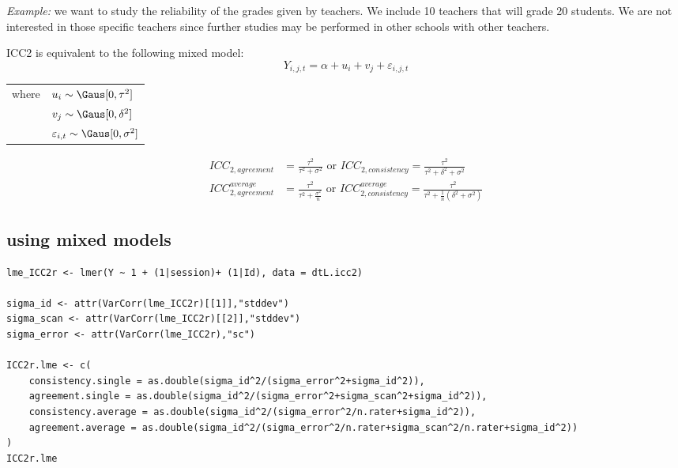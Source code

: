 \documentclass[12pt]{article}
\begin{document}
\bigskip

\emph{Example:} we want to study the reliability of the grades given by
teachers. We include 10 teachers that will grade 20 students. We are
not interested in those specific teachers since further studies may be
performed in other schools with other teachers.

\bigskip

ICC2 is equivalent to the following mixed model:
\begin{equation}
Y_{i,j,t} = \alpha + u_{i} + v_{j} + \varepsilon_{i,j,t}
\end{equation}

\begin{tabular}{ll}
where & \(u_{i} \sim \Gaus[0,\tau^2] \) \\
 &  \(v_{j} \sim \Gaus[0,\delta^2] \) \\
 & \(\varepsilon_{i,t} \sim \Gaus[0,\sigma^2] \) \\
\end{tabular}

\begin{align}
 ICC_{2,agreement} &= \frac{\tau^2}{\tau^2 + \sigma^2} \text{ or } ICC_{2,consistency} = \frac{\tau^2}{\tau^2 + \delta^2 + \sigma^2} \\
 ICC^{average}_{2,agreement} &= \frac{\tau^2}{\tau^2 + \frac{\sigma^2}{n}} \text{ or } ICC^{average}_{2,consistency} = \frac{\tau^2}{\tau^2 + \frac{1}{n}(\delta^2 + \sigma^2)}
\end{align}


\subsection{using mixed models}
\label{sec:org5be25e1}
\lstset{language=r,label= ,caption= ,captionpos=b,numbers=none}
\begin{lstlisting}
lme_ICC2r <- lmer(Y ~ 1 + (1|session)+ (1|Id), data = dtL.icc2)

sigma_id <- attr(VarCorr(lme_ICC2r)[[1]],"stddev")
sigma_scan <- attr(VarCorr(lme_ICC2r)[[2]],"stddev")
sigma_error <- attr(VarCorr(lme_ICC2r),"sc")

ICC2r.lme <- c(
    consistency.single = as.double(sigma_id^2/(sigma_error^2+sigma_id^2)),
    agreement.single = as.double(sigma_id^2/(sigma_error^2+sigma_scan^2+sigma_id^2)),
    consistency.average = as.double(sigma_id^2/(sigma_error^2/n.rater+sigma_id^2)),
    agreement.average = as.double(sigma_id^2/(sigma_error^2/n.rater+sigma_scan^2/n.rater+sigma_id^2))
)
ICC2r.lme
\end{lstlisting}
\end{document}

